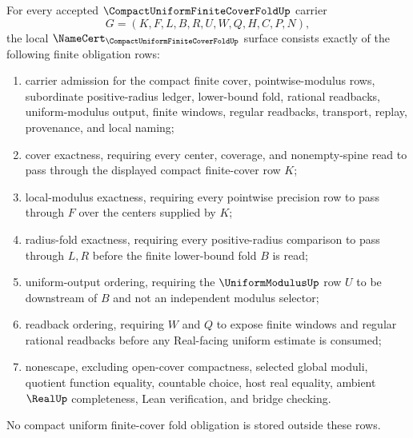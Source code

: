 \begin{theorem}
\label{thm:compact-uniform-finite-cover-fold-namecert-obligations}
For every accepted $\CompactUniformFiniteCoverFoldUp$ carrier
$$
G=(K,F,L,B,R,U,W,Q,H,C,P,N),
$$
the local $\NameCert_{\CompactUniformFiniteCoverFoldUp}$ surface consists exactly of the following finite obligation rows:
\begin{enumerate}
\item carrier admission for the compact finite cover, pointwise-modulus rows, subordinate positive-radius ledger, lower-bound fold, rational readbacks, uniform-modulus output, finite windows, regular readbacks, transport, replay, provenance, and local naming;
\item cover exactness, requiring every center, coverage, and nonempty-spine read to pass through the displayed compact finite-cover row $K$;
\item local-modulus exactness, requiring every pointwise precision row to pass through $F$ over the centers supplied by $K$;
\item radius-fold exactness, requiring every positive-radius comparison to pass through $L,R$ before the finite lower-bound fold $B$ is read;
\item uniform-output ordering, requiring the $\UniformModulusUp$ row $U$ to be downstream of $B$ and not an independent modulus selector;
\item readback ordering, requiring $W$ and $Q$ to expose finite windows and regular rational readbacks before any Real-facing uniform estimate is consumed;
\item nonescape, excluding open-cover compactness, selected global moduli, quotient function equality, countable choice, host real equality, ambient $\RealUp$ completeness, Lean verification, and bridge checking.
\end{enumerate}
No compact uniform finite-cover fold obligation is stored outside these rows.
\end{theorem}
